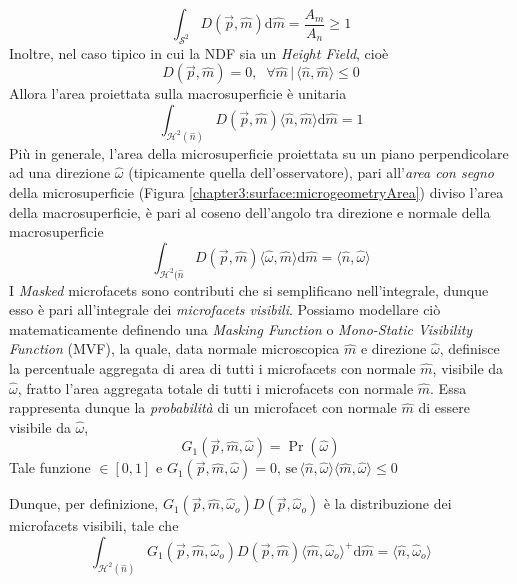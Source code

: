 \begin{equation}
	\int_{\mathcal{S}^2}D(\vec{p},\hat{m})\mathrm{d}\hat{m} = \frac{A_m}{A_n}\geq1
\end{equation}
Inoltre, nel caso tipico in cui la NDF sia un \textit{Height Field}, cio\`e 
\begin{equation}
	D(\vec{p},\hat{m})=0,\;\;\forall\hat{m}\,\vert\,\langle\hat{n},\hat{m}\rangle\leq0
\end{equation}
Allora l'area proiettata sulla macrosuperficie \`e unitaria
\begin{equation}\label{chapter3:surface:NDFNormalization}
	\int_{\mathcal{H}^2(\hat{n})}D(\vec{p},\hat{m})\langle\hat{n},\hat{m}\rangle\mathrm{d}\hat{m}=1
\end{equation}
Pi\`u in generale, l'area della microsuperficie proiettata su un piano perpendicolare ad una direzione $\hat{\omega}$ 
(tipicamente quella dell'osservatore), pari all'\textit{area con segno} della microsuperficie (Figura \ref{chapter3:surface:microgeometryArea}) 
diviso l'area della macrosuperficie, \`e pari al coseno dell'angolo tra direzione e normale della macrosuperficie
\begin{equation}
	\int_{\mathcal{H}^2(\hat{n}}D(\vec{p},\hat{m})\langle\hat{\omega},\hat{m}\rangle\mathrm{d}\hat{m}=\langle\hat{n},\hat{\omega}\rangle
\end{equation}
I \textit{Masked} microfacets sono contributi che si semplificano nell'integrale, dunque esso \`e pari all'integrale dei \textit{microfacets visibili}.
Possiamo modellare ci\`o matematicamente definendo una \textit{Masking Function} o \textit{Mono-Static Visibility Function} (MVF), la quale, data 
normale microscopica $\hat{m}$ e direzione $\hat{\omega}$, definisce la percentuale aggregata di area di tutti i microfacets con normale $\hat{m}$,
visibile da $\hat{\omega}$, fratto l'area aggregata totale di tutti i microfacets con normale $\hat{m}$. Essa rappresenta dunque la 
\textit{probabilit\`a} di un microfacet con normale $\hat{m}$ di essere visibile da $\hat{\omega}$, 
\begin{equation}
	G_1(\vec{p},\hat{m},\hat{\omega}) = \Pr(\hat{\omega})
\end{equation}
Tale funzione $\in[0,1]$ e $G_1(\vec{p},\hat{m},\hat{\omega})=0,\,\mathrm{se}\,%
	\langle\hat{n},\hat{\omega}\rangle\langle\hat{m},\hat{\omega}\rangle\leq0$\par
Dunque, per definizione, $G_1(\vec{p},\hat{m},\hat{\omega}_o)D(\vec{p},\hat{\omega}_o)$ \`e la distribuzione dei microfacets visibili, tale che
\begin{equation}
	\int_{\mathcal{H}^2(\hat{n})}G_1(\vec{p},\hat{m},\hat{\omega}_o)D(\vec{p},\hat{m})\langle\hat{m},\hat{\omega}_o\rangle^+\mathrm{d}\hat{m}%
		=\langle\hat{n},\hat{\omega}_o\rangle
\end{equation}
